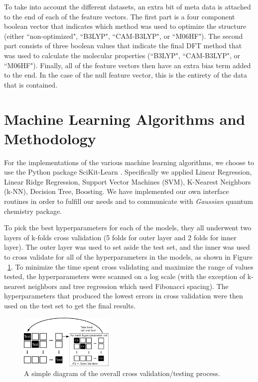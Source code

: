 \documentclass[10pt, oneside]{article}   	%
\begin{document}
To take into account the different datasets, an extra bit of meta data is attached to the end of each of the feature vectors. The first part is a four component boolean vector that indicates which method was used to optimize the structure (either ``non-optimized", ``B3LYP", ``CAM-B3LYP", or ``M06HF"). The second part consists of three boolean values that indicate the final DFT method that was used to calculate the molecular properties (``B3LYP", ``CAM-B3LYP", or ``M06HF"). Finally, all of the feature vectors then have an extra bias term added to the end. In the case of the null feature vector, this is the entirety of the data that is contained.





\section{Machine Learning Algorithms and Methodology}

\noindent For the implementations of the various machine learning algorithms, we choose to use the Python package SciKit-Learn \cite{scikit-learn}. Specifically we applied Linear Regression, Linear Ridge Regression, Support Vector Machines (SVM), K-Nearest Neighbors (k-NN), Decision Tree, Boosting. We have implemented our own interface routines in order to fulfill our needs and to communicate with \textit{Gaussian} quantum chemistry package.

To pick the best hyperparameters for each of the models, they all underwent two layers of k-folds cross validation (5 folds for outer layer and 2 folds for inner layer). The outer layer was used to set aside the test set, and the inner was used to cross validate for all of the hyperparameters in the models, as shown in Figure ~\ref{crossvalidation}. To minimize the time spent cross validating and maximize the range of values tested, the hyperparameters were scanned on a log scale (with the exception of k-nearest neighbors and tree regression which used Fibonacci spacing). The hyperparameters that produced the lowest errors in cross validation were then used on the test set to get the final results.

\begin{figure}[H]
\begin{center}
\includegraphics [width=0.4\textwidth]{crossvalidation.png}
\caption{A simple diagram of the overall cross validation/testing process.}\label{crossvalidation}
\end{center}
\end{figure}
\end{document}
